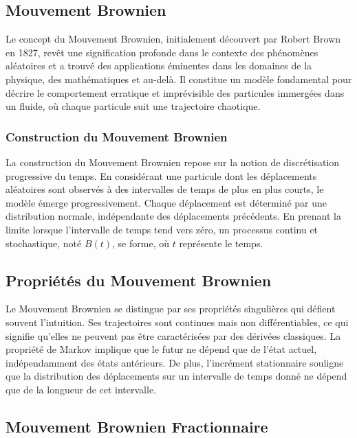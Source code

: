 \subsection{Mouvement Brownien}

Le concept du Mouvement Brownien, initialement découvert par Robert Brown en 1827, revêt une signification profonde dans le contexte des phénomènes aléatoires et a trouvé des applications éminentes dans les domaines de la physique, des mathématiques et au-delà. Il constitue un modèle fondamental pour décrire le comportement erratique et imprévisible des particules immergées dans un fluide, où chaque particule suit une trajectoire chaotique.

\subsubsection{Construction du Mouvement Brownien}

La construction du Mouvement Brownien repose sur la notion de discrétisation progressive du temps. En considérant une particule dont les déplacements aléatoires sont observés à des intervalles de temps de plus en plus courts, le modèle émerge progressivement. Chaque déplacement est déterminé par une distribution normale, indépendante des déplacements précédents. En prenant la limite lorsque l'intervalle de temps tend vers zéro, un processus continu et stochastique, noté $B(t)$, se forme, où $t$ représente le temps.

\subsection{Propriétés du Mouvement Brownien}

Le Mouvement Brownien se distingue par ses propriétés singulières qui défient souvent l'intuition. Ses trajectoires sont continues mais non différentiables, ce qui signifie qu'elles ne peuvent pas être caractérisées par des dérivées classiques. La propriété de Markov implique que le futur ne dépend que de l'état actuel, indépendamment des états antérieurs. De plus, l'incrément stationnaire souligne que la distribution des déplacements sur un intervalle de temps donné ne dépend que de la longueur de cet intervalle.

\subsection{Mouvement Brownien Fractionnaire}

